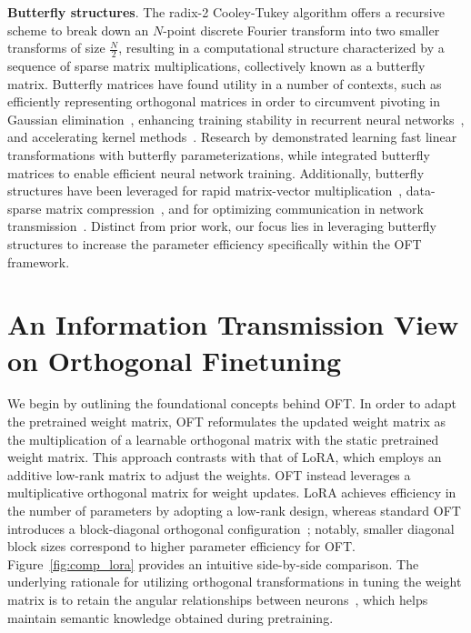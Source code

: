 \textbf{Butterfly structures}. The radix-2 Cooley-Tukey algorithm offers a recursive scheme to break down an $N$-point discrete Fourier transform into two smaller transforms of size $\frac{N}{2}$, resulting in a computational structure characterized by a sequence of sparse matrix multiplications, collectively known as a butterfly matrix. Butterfly matrices have found utility in a number of contexts, such as efficiently representing orthogonal matrices in order to circumvent pivoting in Gaussian elimination~\cite{parker1995random}, enhancing training stability in recurrent neural networks~\cite{jing2017tunable}, and accelerating kernel methods~\cite{munkhoeva2018quadrature}. Research by \cite{dao2019learning,dao2019kaleidoscope} demonstrated learning fast linear transformations with butterfly parameterizations, while \cite{chen2022pixelated,dao2022monarch} integrated butterfly matrices to enable efficient neural network training. Additionally, butterfly structures have been leveraged for rapid matrix-vector multiplication~\cite{michielssen1996multilevel,o2010algorithm}, data-sparse matrix compression~\cite{li2015butterfly}, and for optimizing communication in network transmission~\cite{klasing1994broadcasting,li2003linear,rajasingh2016transmission}. Distinct from prior work, our focus lies in leveraging butterfly structures to increase the parameter efficiency specifically within the OFT framework.

\section{An Information Transmission View on Orthogonal Finetuning}

We begin by outlining the foundational concepts behind OFT. In order to adapt the pretrained weight matrix, OFT reformulates the updated weight matrix as the multiplication of a learnable orthogonal matrix with the static pretrained weight matrix. This approach contrasts with that of LoRA, which employs an additive low-rank matrix to adjust the weights. OFT instead leverages a multiplicative orthogonal matrix for weight updates. LoRA achieves efficiency in the number of parameters by adopting a low-rank design, whereas standard OFT introduces a block-diagonal orthogonal configuration~\cite{qiu2023controlling}; notably, smaller diagonal block sizes correspond to higher parameter efficiency for OFT. Figure~\ref{fig:comp_lora} provides an intuitive side-by-side comparison. The underlying rationale for utilizing orthogonal transformations in tuning the weight matrix is to retain the angular relationships between neurons~\cite{liu2018learning,liu2021orthogonal,qiu2023controlling}, which helps maintain semantic knowledge obtained during pretraining. 

